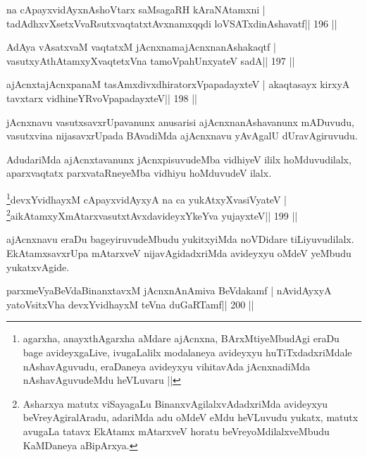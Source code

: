 \begin{shl}
na cApayxvidAyxnAshoV\s tarx saMsagaRH kAraNAtamxni |
tadAdhxvXsetxVvaRsutxvaqtatxtAvxnamxqqdi loVSATxdinAshavatf\hfill || 196 ||
\end{shl}

\begin{shl}
AdAya vAsatxvaM vaqtatxM jAcnxnamajAcnxnanAshakaqtf |
vasutxyAthAtamxyXvaqtetxVna tamoV\s pahUnxyateV sadA\hfill || 197 ||
\end{shl}

\begin{shl}
ajAcnxtajAcnxpanaM tasAmxdivxdhiratorxVpapadayxteV |
akaqtasayx kirxyA tavxtarx vidhineYRvoVpapadayxteV\hfill || 198 ||
\end{shl}

\begin{artha}
jAcnxnavu vasutxsavxrUpavanunx anusarisi ajAcnxnanAshavanunx mADuvudu, vasutxvina nijasavxrUpada BAvadiMda ajAcnxnavu yAvAgalU dUravAgiruvudu.
\end{artha}

\begin{artha}
AdudariMda ajAcnxtavanunx jAcnxpisuvudeMba vidhiyeV ililx hoMduvudilalx, aparxvaqtatx parxvataRneyeMba vidhiyu hoMduvudeV ilalx.
\end{artha}


\begin{shl}
\footnote{agarxha, anayxthAgarxha aMdare ajAcnxna, BArxMtiyeMbudAgi eraDu bage avideyxgaLive, ivugaLalilx modalaneya avideyxyu huTiTxdadxriMdale nAshavAguvudu, eraDaneya avideyxyu vihitavAda jAcnxnadiMda nAshavAguvudeMdu heVLuvaru ||}devxYvidhayxM cApayxvidAyxyA na ca yukAtxyX\s vasiVyateV |
\footnote{Asharxya matutx viSayagaLu BinanxvAgilalxvAdadxriMda avideyxyu beVreyAgiralAradu, adariMda adu oMdeV eMdu heVLuvudu yukatx, matutx avugaLa tatavx EkAtamx mAtarxveV horatu beVreyoMdilalxveMbudu KaMDaneya aBipArxya.}aikAtamxyXmAtarxvasutxtAvxdavideyxYkeYva yujayxteV\hfill || 199 ||
\end{shl}

\begin{artha}
ajAcnxnavu eraDu bageyiruvudeMbudu yukitxyiMda noVDidare tiLiyuvudilalx. EkAtamxsavxrUpa mAtarxveV nijavAgidadxriMda avideyxyu oMdeV yeMbudu yukatxvAgide.
\end{artha}

\begin{shl}
parxmeVyaBeVdaBinanxtavxM jAcnxnAnAmiva BeVdakamf |
nAvidAyxyA yatoV\s sitxVha devxYvidhayxM teVna duGaRTamf\hfill || 200 ||
\end{shl}

